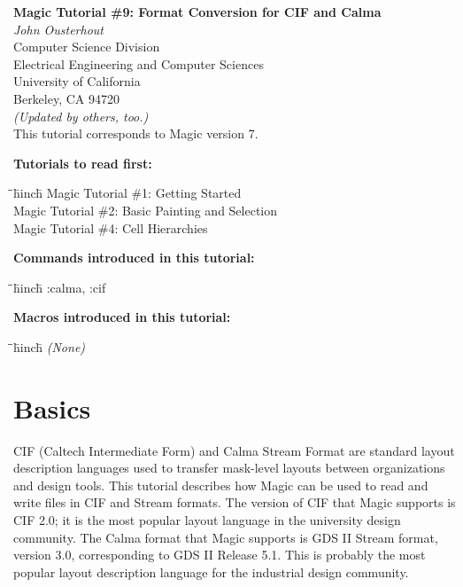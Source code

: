 \documentclass[letterpaper,twoside,12pt]{article}
\def\hinch{\hspace*{0.5in}}
\def\starti{\begin{center}\begin{tabbing}\hinch\=\hinch\=\hinch\=hinch\hinch\=\kill}
\def\endi{\end{tabbing}\end{center}}
\def\mytitle{Magic Tutorial \#9: Format Conversion for CIF and Calma}
\begin{document}
\makeatletter
\newcommand{\ps@magic}{%
	\renewcommand{\@oddhead}{\mytitle\hfil\today}%
	\renewcommand{\@evenhead}{\today\hfil\mytitle}%
	\renewcommand{\@evenfoot}{\hfil\textrm{--{\thepage}--}\hfil}%
	\renewcommand{\@oddfoot}{\@evenfoot}}
\newcommand{\ps@mplain}{%
	\renewcommand{\@oddhead}{}%
	\renewcommand{\@evenhead}{}%
	\renewcommand{\@evenfoot}{\hfil\textrm{--{\thepage}--}\hfil}%
	\renewcommand{\@oddfoot}{\@evenfoot}}
\makeatother
\pagestyle{magic}
\thispagestyle{mplain}


\begin{center}
  {\bfseries \Large \mytitle} \\
  \vspace*{0.5in}
  {\itshape John Ousterhout} \\
  \vspace*{0.5in}
   Computer Science Division \\
   Electrical Engineering and Computer Sciences \\
   University of California \\
   Berkeley, CA  94720 \\
  \vspace*{0.25in}
  {\itshape (Updated by others, too.)} \\
  \vspace*{0.25in}
  This tutorial corresponds to Magic version 7. \\
\end{center}
\vspace*{0.5in}

{\noindent\bfseries\large Tutorials to read first:}
\starti
   \> Magic Tutorial \#1: Getting Started \\
   \> Magic Tutorial \#2: Basic Painting and Selection \\
   \> Magic Tutorial \#4: Cell Hierarchies
\endi

{\noindent\bfseries\large Commands introduced in this tutorial:}
\starti
   \> :calma, :cif
\endi

{\noindent\bfseries\large Macros introduced in this tutorial:}

\starti
   \> {\itshape (None)}
\endi

\vspace*{0.75in}
\section{Basics}

CIF (Caltech Intermediate Form) and Calma Stream Format are
standard layout description languages used to transfer mask-level layouts
between organizations and design tools.  This tutorial describes
how Magic can be used to read and write files in CIF and Stream
formats.  The version of CIF that Magic supports is CIF 2.0; it
is the most popular layout language in the university design
community.  The Calma format that Magic supports is GDS II Stream
format, version 3.0, corresponding to GDS II Release 5.1.  This
is probably the most popular layout description language for the
industrial design community.
\end{document}
